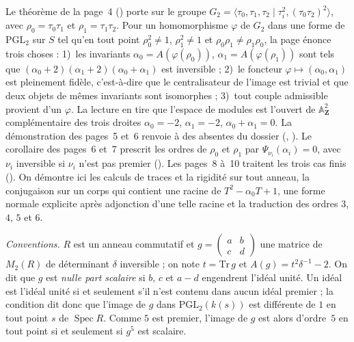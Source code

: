 Le théorème de la page~4 () porte sur le groupe $G_2 = \langle \tau_0, \tau_1, \tau_2 \mid \tau_i^2, (\tau_0\tau_2)^2\rangle$, avec $\rho_0 = \tau_0\tau_1$ et $\rho_1 = \tau_1\tau_2$. Pour un homomorphisme $\varphi$ de $G_2$ dans une forme de $\mathrm{PGL}_2$ sur $S$ tel qu'en tout point $\rho_0^2 \neq 1$, $\rho_1^2 \neq 1$ et $\rho_0\rho_1 \neq \rho_1\rho_0$, la page énonce trois choses : 1)~les invariants $\alpha_0 = A(\varphi(\rho_0))$, $\alpha_1 = A(\varphi(\rho_1))$ sont tels que $(\alpha_0 + 2)(\alpha_1 + 2)(\alpha_0 + \alpha_1)$ est inversible ; 2)~le foncteur $\varphi \mapsto (\alpha_0, \alpha_1)$ est pleinement fidèle, c'est-à-dire que le centralisateur de l'image est trivial et que deux objets de mêmes invariants sont isomorphes ; 3)~tout couple admissible provient d'un $\varphi$. La lecture en tire que l'espace de modules est l'ouvert de $\mathbb A^2_{\mathbf Z}$ complémentaire des trois droites $\alpha_0 = -2$, $\alpha_1 = -2$, $\alpha_0 + \alpha_1 = 0$. La démonstration des pages~5 et~6 renvoie à des  absentes du dossier (, ). Le corollaire des pages~6 et~7 prescrit les ordres de $\rho_0$ et $\rho_1$ par $\Psi_{\nu_i}(\alpha_i) = 0$, avec $\nu_i$ inversible si $\nu_i$ n'est pas premier (). Les pages~8 à~10 traitent les trois cas finis (). On démontre ici les calculs de traces et la rigidité sur tout anneau, la conjugaison sur un corps qui contient une racine de $T^2 - \alpha_0 T + 1$, une forme normale explicite après adjonction d'une telle racine et la traduction des ordres $3$, $4$, $5$ et $6$.

\noindent\emph{Conventions.} $R$ est un anneau commutatif et $g = \begin{pmatrix} a & b \\ c & d \end{pmatrix}$ une matrice de $M_2(R)$ de déterminant $\delta$ inversible ; on note $t = \mathrm{Tr}\, g$ et $A(g) = t^2\delta^{-1} - 2$. On dit que $g$ est \emph{nulle part scalaire} si $b$, $c$ et $a - d$ engendrent l'idéal unité. Un idéal est l'idéal unité si et seulement s'il n'est contenu dans aucun idéal premier ; la condition dit donc que l'image de $g$ dans $\mathrm{PGL}_2(k(s))$ est différente de $1$ en tout point $s$ de $\operatorname{Spec} R$. Comme $5$ est premier, l'image de $g$ est alors d'ordre~$5$ en tout point si et seulement si $g^5$ est scalaire.

